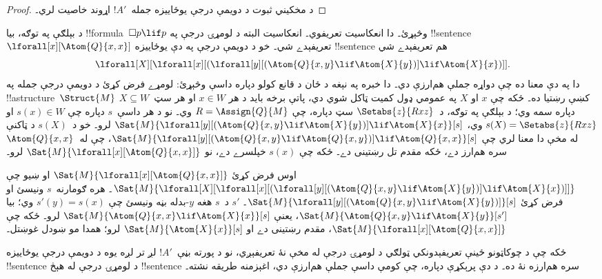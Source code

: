 \documentclass[../../../include/open-logic-section]{subfiles}
\begin{document}
\begin{proof}
  د مخکيني ثبوت د دويمې درجې
  يوځاييزه جمله~$!A'$ اړوند
  خاصيت لري۔
\end{proof}

د بېلګې په توګه، بيا !!{formula}~$\Box p \lif p$
وڅېړئ۔ دا انعکاسيت تعريفوي۔ انعکاسيت البته د
لومړۍ درجې په !!{sentence}~$\lforall[x][\Atom{Q}{x,x}]$
تعريفېدے شي۔ خو د دويمې درجې په دې يوځاييزه
!!{sentence} هم تعريفېدے شي
\[
\lforall[X][\lforall[x][(\lforall[y][(\Atom{Q}{x,y} \lif \Atom{X}{y})]
    \lif \Atom{X}{x})]].
\]
دا په دې معنا ده چې دواړه جملې هم‌ارزې دي۔ دا خبره
په نېغه د ځان د قانع کولو دپاره داسې وڅېړئ: لومړے
فرض کړئ د دويمې درجې جمله په
!!a{structure}~$\Struct{M}$ کښې رښتيا ده۔ ځکه چې
$x$ او $X$ په عمومي ډول کميت ټاکل شوي دي، پاتې
برخه بايد د هر $x \in W$ او هر
سټ~$X \subseteq W$ دپاره سمه وي؛ د بېلګې په
توګه، د~$\Setabs{z}{Rxz}$ سټ دپاره، چې
$R = \Assign{Q}{M}$ وي۔ نو د هر
داسې~$s$ دپاره چې $s(x) \in W$
او $s(X) = \Setabs{z}{Rxz}$ وي،
$\Sat{M}{\lforall[y][(\Atom{Q}{x,y} \lif
    \Atom{X}{y})] \lif \Atom{X}{x}}[s]$ لرو۔
خو د~$s(X)$ د ټاکنې له مخې دا معنا لري چې
$\Sat{M}{\lforall[y][(\Atom{Q}{x,y} \lif
    \Atom{Q}{x,y})] \lif \Atom{Q}{x,x}}[s]$،
چې له~$\Atom{Q}{x,x}$ سره هم‌ارز دے، ځکه مقدم
تل رښتينی دے۔ ځکه چې $s(x)$ خپلسرے دے، نو
$\Sat{M}{\lforall[x][\Atom{Q}{x,x}]}$ لرو۔

اوس فرض کړئ $\Sat{M}{\lforall[x][\Atom{Q}{x,x}]}$
او ښيو چې
$\Sat{M}{\lforall[X][\lforall[x][(\lforall[y][(\Atom{Q}{x,y} \lif
        \Atom{X}{y})] \lif \Atom{X}{x})]]}$۔
هره ګومارنه~$s$ ونيسئ او فرض کړئ
$\Sat{M}{\lforall[y][(\Atom{Q}{x,y} \lif
    \Atom{X}{y})]}[s]$۔
$s'$ د~$s$ هغه $y$-بدله بڼه ونيسئ چې
$s'(y) = s(x)$ وي؛ بيا
$\Sat{M}{\Atom{Q}{x,y} \lif \Atom{X}{y}}[s']$،
يعنې $\Sat{M}{\Atom{Q}{x,x} \lif \Atom{X}{x}}[s]$
لرو۔ ځکه چې
$\Sat{M}{\lforall[x][\Atom{Q}{x,x}]}$،
مقدم رښتينی دے او
$\Sat{M}{\Atom{X}{x}}[s]$ لرو؛ همدا مو
ښودل غوښتل۔

ځکه چې د چوکاټونو ځينې تعريفېدونکي ټولګي د
لومړۍ درجې له مخې نۀ تعريفېږي، نو د پورته
بڼې~$!A'$ لږ تر لږه يوه د دويمې درجې يوځاييزه
!!{sentence} د لومړۍ درجې له هېڅ
!!{sentence} سره هم‌ارزه نۀ ده۔
د دې پرېکړې دپاره، چې کومې داسې جملې هم‌ارزې
دي، اغېزمنه طريقه نشته۔
\end{document}
